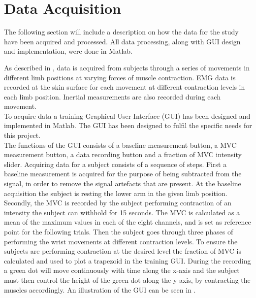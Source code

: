 \section{Data Acquisition} \label{sec:dataAcquisition}

The following section will include a description on how the data for the study have been acquired and processed. All data processing, along with GUI design and implementation, were done in Matlab.

As described in , data is acquired from subjects through a series of movements in different limb positions at varying forces of muscle contraction. EMG data is recorded at the skin surface for each movement at different contraction levels in each limb position. Inertial measurements are also recorded during each movement. \\
To acquire data a training Graphical User Interface (GUI) has been designed and implemented in Matlab. The GUI has been designed to fulfil the specific needs for this project. \\
The functions of the GUI consists of a baseline measurement button, a MVC measurement button, a data recording button and a fraction of MVC intensity slider. Acquiring data for a subject consists of a sequence of steps. First a baseline measurement is acquired for the purpose of being subtracted from the signal, in order to remove the signal artefacts that are present. At the baseline acquisition the subject is resting the lower arm in the given limb position. \\
Secondly, the MVC is recorded by the subject performing contraction of an intensity the subject can withhold for 15 seconds. The MVC is calculated as a mean of the maximum values in each of the eight channels, and is set as reference point for the following trials.
Then the subject goes through three phases of performing the wrist movements at different contraction levels. To ensure the subjects are performing contraction at the desired level the fraction of MVC is calculated and used to plot a trapezoid in the training GUI. During the recording a green dot will move continuously with time along the x-axis and the subject must then control the height of the green dot along the y-axis, by contracting the muscles accordingly.
An illustration of the GUI can be seen in . 


